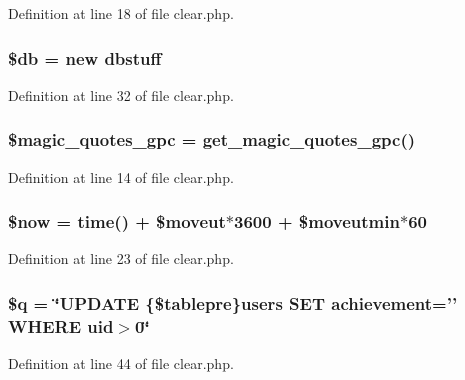 Definition at line 18 of file clear.\+php.

\hypertarget{clear_8php_a1fa3127fc82f96b1436d871ef02be319}{
\subsubsection[{\$db}]{\setlength{\rightskip}{0pt plus 5cm}\$db = new {\bf dbstuff}}}\label{clear_8php_a1fa3127fc82f96b1436d871ef02be319}


Definition at line 32 of file clear.\+php.

\hypertarget{clear_8php_a3bf6a6f8faa278d5cceb69655ecdb782}{
\subsubsection[{\$magic\+\_\+quotes\+\_\+gpc}]{\setlength{\rightskip}{0pt plus 5cm}\$magic\+\_\+quotes\+\_\+gpc = get\+\_\+magic\+\_\+quotes\+\_\+gpc()}}\label{clear_8php_a3bf6a6f8faa278d5cceb69655ecdb782}


Definition at line 14 of file clear.\+php.

\hypertarget{clear_8php_af1d5ccdee975b8f4d20aaffc5b28557c}{
\subsubsection[{\$now}]{\setlength{\rightskip}{0pt plus 5cm}\$now = time() + \$moveut$\ast$3600 + \$moveutmin$\ast$60}}\label{clear_8php_af1d5ccdee975b8f4d20aaffc5b28557c}


Definition at line 23 of file clear.\+php.

\hypertarget{clear_8php_abb0f8f809252372e25f48d52b63ef29d}{
\subsubsection[{\$q}]{\setlength{\rightskip}{0pt plus 5cm}\$q = \char`\"{}U\+P\+D\+A\+T\+E \{\$tablepre\}users S\+E\+T achievement='' W\+H\+E\+R\+E uid$>$0\char`\"{}}}\label{clear_8php_abb0f8f809252372e25f48d52b63ef29d}


Definition at line 44 of file clear.\+php.

